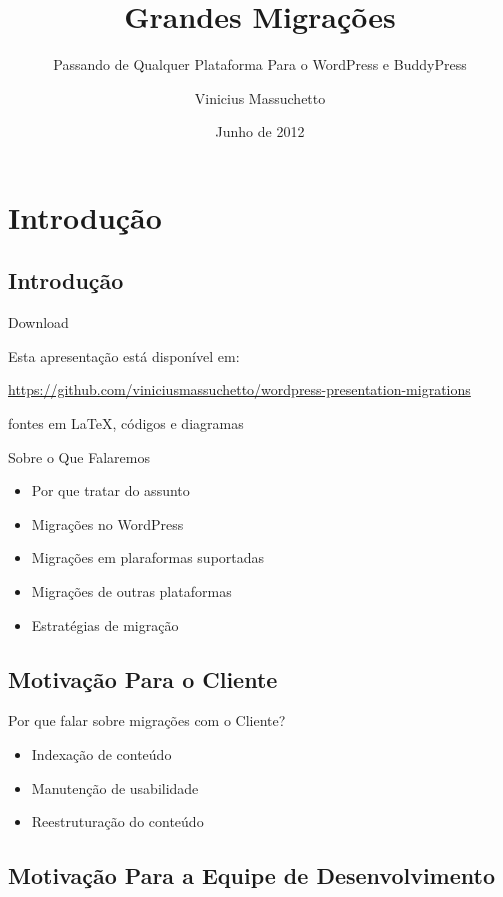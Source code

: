 \documentclass{beamer}
\title{Grandes Migrações}
\subtitle{Passando de Qualquer Plataforma Para o WordPress e BuddyPress}
\author{Vinicius Massuchetto}
\institute{WordCamp Curitiba 2012}
\date{Junho de 2012}
\begin{document}
\frame{\titlepage}

\section{Introdução}

\subsection{Introdução}

\begin{frame}{Download}
  \begin{center}
    Esta apresentação está disponível em:

    \url{https://github.com/viniciusmassuchetto/wordpress-presentation-migrations}

    \footnotesize fontes em \LaTeX{}, códigos e diagramas
  \end{center}
\end{frame}

\begin{frame}{Sobre o Que Falaremos}
\begin{itemize}
  \item Por que tratar do assunto
  \item Migrações no WordPress
  \item Migrações em plaraformas suportadas
  \item Migrações de outras plataformas
  \item Estratégias de migração
\end{itemize}
\end{frame}


\subsection{Motivação Para o Cliente}

\begin{frame}{Por que falar sobre migrações com o Cliente?}
\begin{itemize}
  \pause \item Indexação de conteúdo
  \pause \item Manutenção de usabilidade
  \pause \item Reestruturação do conteúdo
\end{itemize}
\end{frame}

\subsection{Motivação Para a Equipe de Desenvolvimento}
\end{document}
